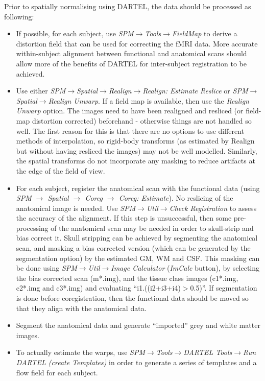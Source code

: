 Prior to spatially normalising using DARTEL, the data should be processed as following:
\begin{itemize}
\item{If possible, for each subject, use \emph{SPM$\rightarrow$Tools$\rightarrow$FieldMap} to derive a distortion field that can be used for correcting the fMRI data.
More accurate within-subject alignment between functional and anatomical scans should allow more of the benefits of DARTEL for inter-subject registration to be achieved.}
\item{Use either \emph{SPM$\rightarrow$Spatial$\rightarrow$Realign$\rightarrow$Realign: Estimate Reslice} or \emph{SPM$\rightarrow$Spatial$\rightarrow$Realign Unwarp}.  If a field map is available, then use the \emph{Realign Unwarp} option.
The images need to have been realigned and resliced (or field-map distortion corrected) beforehand - otherwise things are not handled so well.  The first reason for this is that there are no options to use different methods of interpolation, so rigid-body transforms (as estimated by Realign but without having resliced the images) may not be well modelled.  Similarly, the spatial transforms do not incorporate any masking to reduce artifacts at the edge of the field of view.}
\item{For each subject, register the anatomical scan with the functional data (using \emph{SPM $\rightarrow$ Spatial $\rightarrow$ Coreg $\rightarrow$ Coreg: Estimate}).  No reslicing of the anatomical image is needed.
Use \emph{SPM$\rightarrow$Util$\rightarrow$Check Registration} to assess the accuracy of the alignment.
If this step is unsuccessful, then some pre-processing of the anatomical scan may be needed in order to skull-strip and bias correct it.
Skull stripping can be achieved by segmenting the anatomical scan, and masking a bias corrected version (which can be generated by the segmentation option) by the estimated GM, WM and CSF.  This masking can be done using \emph{SPM$\rightarrow$Util$\rightarrow$Image Calculator} (\emph{ImCalc} button), by selecting the bias corrected scan (m*.img), and the tissue class images (c1*.img, c2*.img and c3*.img) and evaluating ``i1.\*((i2+i3+i4)$>$0.5)''.
If segmentation is done before coregistration, then the functional data should be moved so that they align with the anatomical data.}
\item{Segment the anatomical data and generate ``imported'' grey and white matter images.}
\item{To actually estimate the warps, use \emph{SPM$\rightarrow$Tools$\rightarrow$DARTEL Tools$\rightarrow$Run DARTEL (create Templates)} in order to generate a series of templates and a flow field for each subject.}
\end{itemize}

